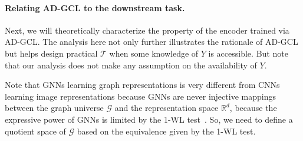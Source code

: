 \paragraph{Relating AD-GCL to the downstream task.} %
Next, we will theoretically characterize the property of the encoder trained via AD-GCL.  %
The analysis here not only further illustrates the rationale of AD-GCL but helps design practical $\mathcal{T}$ when some knowledge of $Y$ is accessible. But note that our analysis does not make any assumption on the availability of $Y$.

Note that GNNs learning graph representations is very different from CNNs learning image representations because GNNs are never injective mappings between the graph universe $\mathcal{G}$ and the representation space $\mathbb{R}^d$, because the expressive power of GNNs is limited by the 1-WL test~\cite{weisfeiler1968reduction,xu2018powerful,morris2019weisfeiler}. So, we need to define a quotient space of $\mathcal{G}$ based on the equivalence given by the 1-WL test. \vspace{-1mm}

